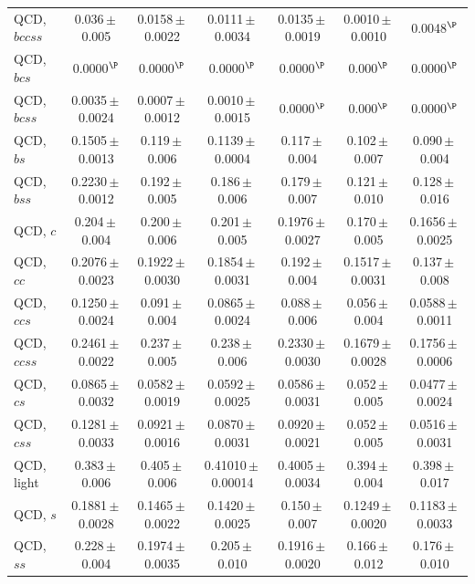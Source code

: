 \begin{landscape}
{\begin{longtable}{@{\extracolsep{\fill}}lcccccc@{}}
QCD, $bccss$ & 0.036\,$\pm$\,0.005 & 0.0158\,$\pm$\,0.0022 & 0.0111\,$\pm$\,0.0034 & 0.0135\,$\pm$\,0.0019 & 0.0010\,$\pm$\,0.0010 & 0.0048$^{\P}$ \\
QCD, $bcs$ & 0.0000$^{\P}$ & 0.0000$^{\P}$ & 0.0000$^{\P}$ & 0.0000$^{\P}$ & 0.000$^{\P}$ & 0.0000$^{\P}$ \\
QCD, $bcss$ & 0.0035\,$\pm$\,0.0024 & 0.0007\,$\pm$\,0.0012 & 0.0010\,$\pm$\,0.0015 & 0.0000$^{\P}$ & 0.000$^{\P}$ & 0.0000$^{\P}$ \\
QCD, $bs$ & 0.1505\,$\pm$\,0.0013 & 0.119\,$\pm$\,0.006 & 0.1139\,$\pm$\,0.0004 & 0.117\,$\pm$\,0.004 & 0.102\,$\pm$\,0.007 & 0.090\,$\pm$\,0.004 \\
QCD, $bss$ & 0.2230\,$\pm$\,0.0012 & 0.192\,$\pm$\,0.005 & 0.186\,$\pm$\,0.006 & 0.179\,$\pm$\,0.007 & 0.121\,$\pm$\,0.010 & 0.128\,$\pm$\,0.016 \\
QCD, $c$ & 0.204\,$\pm$\,0.004 & 0.200\,$\pm$\,0.006 & 0.201\,$\pm$\,0.005 & 0.1976\,$\pm$\,0.0027 & 0.170\,$\pm$\,0.005 & 0.1656\,$\pm$\,0.0025 \\
QCD, $cc$ & 0.2076\,$\pm$\,0.0023 & 0.1922\,$\pm$\,0.0030 & 0.1854\,$\pm$\,0.0031 & 0.192\,$\pm$\,0.004 & 0.1517\,$\pm$\,0.0031 & 0.137\,$\pm$\,0.008 \\
QCD, $ccs$ & 0.1250\,$\pm$\,0.0024 & 0.091\,$\pm$\,0.004 & 0.0865\,$\pm$\,0.0024 & 0.088\,$\pm$\,0.006 & 0.056\,$\pm$\,0.004 & 0.0588\,$\pm$\,0.0011 \\
QCD, $ccss$ & 0.2461\,$\pm$\,0.0022 & 0.237\,$\pm$\,0.005 & 0.238\,$\pm$\,0.006 & 0.2330\,$\pm$\,0.0030 & 0.1679\,$\pm$\,0.0028 & 0.1756\,$\pm$\,0.0006 \\
QCD, $cs$ & 0.0865\,$\pm$\,0.0032 & 0.0582\,$\pm$\,0.0019 & 0.0592\,$\pm$\,0.0025 & 0.0586\,$\pm$\,0.0031 & 0.052\,$\pm$\,0.005 & 0.0477\,$\pm$\,0.0024 \\
QCD, $css$ & 0.1281\,$\pm$\,0.0033 & 0.0921\,$\pm$\,0.0016 & 0.0870\,$\pm$\,0.0031 & 0.0920\,$\pm$\,0.0021 & 0.052\,$\pm$\,0.005 & 0.0516\,$\pm$\,0.0031 \\
QCD, light & 0.383\,$\pm$\,0.006 & 0.405\,$\pm$\,0.006 & 0.41010\,$\pm$\,0.00014 & 0.4005\,$\pm$\,0.0034 & 0.394\,$\pm$\,0.004 & 0.398\,$\pm$\,0.017 \\
QCD, $s$ & 0.1881\,$\pm$\,0.0028 & 0.1465\,$\pm$\,0.0022 & 0.1420\,$\pm$\,0.0025 & 0.150\,$\pm$\,0.007 & 0.1249\,$\pm$\,0.0020 & 0.1183\,$\pm$\,0.0033 \\
QCD, $ss$ & 0.228\,$\pm$\,0.004 & 0.1974\,$\pm$\,0.0035 & 0.205\,$\pm$\,0.010 & 0.1916\,$\pm$\,0.0020 & 0.166\,$\pm$\,0.012 & 0.176\,$\pm$\,0.010 \\

\end{longtable}}
\end{landscape}
